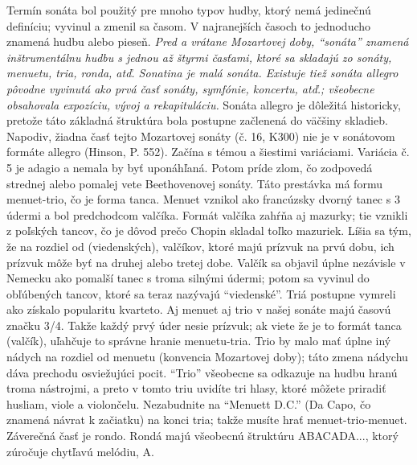 Termín sonáta bol použitý pre mnoho typov hudby, ktorý nemá jedinečnú definíciu; vyvinul a zmenil sa časom. V najranejších časoch to jednoducho znamená hudbu alebo pieseň. \emph{Pred a vrátane Mozartovej doby, “sonáta” znamená inštrumentálnu hudbu s jednou až štyrmi časťami, ktoré sa skladajú zo sonáty, menuetu, tria, ronda, atď. Sonatina je malá sonáta. Existuje tiež sonáta allegro pôvodne vyvinutá ako prvá časť sonáty, symfónie, koncertu, atď.; všeobecne obsahovala expozíciu, vývoj a rekapituláciu.} Sonáta allegro je dôležitá historicky, pretože táto základná štruktúra bola postupne začlenená do väčšiny skladieb. Napodiv, žiadna časť tejto Mozartovej sonáty (č. 16, K300) nie je v sonátovom formáte allegro (Hinson, P. 552). Začína s témou a šiestimi variáciami. Variácia č. 5 je adagio a nemala by byť uponáhľaná. Potom príde zlom, čo zodpovedá strednej alebo pomalej vete Beethovenovej sonáty. Táto prestávka má formu menuet-trio, čo je forma tanca. Menuet vznikol ako francúzsky dvorný tanec s 3 údermi a bol predchodcom valčíka. Formát valčíka zahŕňa aj mazurky; tie vznikli z poľských tancov, čo je dôvod prečo Chopin skladal toľko mazuriek. Líšia sa tým, že na rozdiel od (viedenských), valčíkov, ktoré majú prízvuk na prvú dobu, ich prízvuk môže byť na druhej alebo tretej dobe. Valčík sa objavil úplne nezávisle v Nemecku ako pomalší tanec s troma silnými údermi; potom sa vyvinul do obľúbených tancov, ktoré sa teraz nazývajú “viedenské”. Triá postupne vymreli ako získalo popularitu kvarteto. Aj menuet aj trio v našej sonáte majú časovú značku 3/4. Takže každý prvý úder nesie prízvuk; ak viete že je to formát tanca (valčík), uľahčuje to správne hranie menuetu-tria. Trio by malo mať úplne iný nádych na rozdiel od menuetu (konvencia Mozartovej doby); táto zmena nádychu dáva prechodu osviežujúci pocit. “Trio” všeobecne sa odkazuje na hudbu hranú troma nástrojmi, a preto v tomto triu uvidíte tri hlasy, ktoré môžete priradiť husliam, viole a violončelu. Nezabudnite na “Menuett D.C.” (Da Capo, čo znamená návrat k začiatku) na konci tria; takže musíte hrať menuet-trio-menuet. Záverečná časť je rondo. Rondá majú všeobecnú štruktúru ABACADA..., ktorý zúročuje chytľavú melódiu, A.

